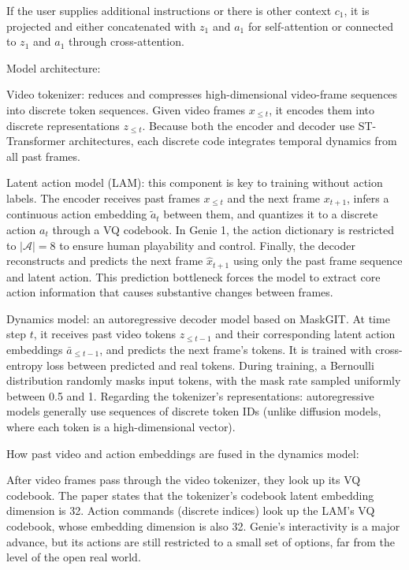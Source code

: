If the user supplies additional instructions or there is other context \(c_1\), it is projected and either concatenated with \(z_1\) and \(a_1\) for self-attention or connected to \(z_1\) and \(a_1\) through cross-attention.

Model architecture:

Video tokenizer: reduces and compresses high-dimensional video-frame sequences into discrete token sequences. Given video frames \(x_{\le t}\), it encodes them into discrete representations \(z_{\le t}\). Because both the encoder and decoder use ST-Transformer architectures, each discrete code integrates temporal dynamics from all past frames.

Latent action model (LAM): this component is key to training without action labels. The encoder receives past frames \(x_{\le t}\) and the next frame \(x_{t+1}\), infers a continuous action embedding \(\tilde{a}_t\) between them, and quantizes it to a discrete action \(a_t\) through a VQ codebook. In Genie 1, the action dictionary is restricted to \(|\mathcal{A}|=8\) to ensure human playability and control. Finally, the decoder reconstructs and predicts the next frame \(\hat{x}_{t+1}\) using only the past frame sequence and latent action. This prediction bottleneck forces the model to extract core action information that causes substantive changes between frames.

Dynamics model: an autoregressive decoder model based on MaskGIT. At time step \(t\), it receives past video tokens \(z_{\le t-1}\) and their corresponding latent action embeddings \(\bar{a}_{\le t-1}\), and predicts the next frame's tokens. It is trained with cross-entropy loss between predicted and real tokens. During training, a Bernoulli distribution randomly masks input tokens, with the mask rate sampled uniformly between 0.5 and 1.
Regarding the tokenizer's representations: autoregressive models generally use sequences of discrete token IDs (unlike diffusion models, where each token is a high-dimensional vector).

How past video and action embeddings are fused in the dynamics model:

After video frames pass through the video tokenizer, they look up its VQ codebook. The paper states that the tokenizer's codebook latent embedding dimension is 32. Action commands (discrete indices) look up the LAM's VQ codebook, whose embedding dimension is also 32.
Genie's interactivity is a major advance, but its actions are still restricted to a small set of options, far from the level of the open real world.

